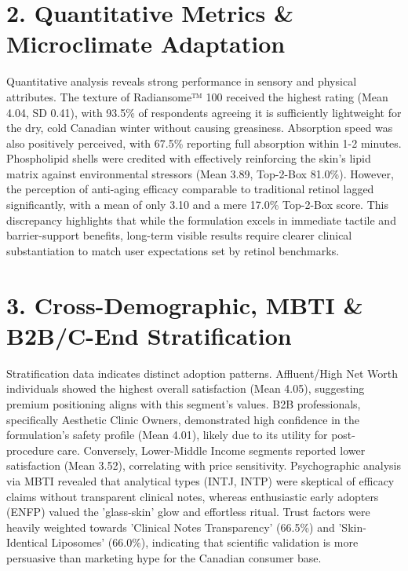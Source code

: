 \documentclass[10pt,twocolumn,a4paper]{article}
\begin{document}
\section{2. Quantitative Metrics \& Microclimate Adaptation}
Quantitative analysis reveals strong performance in sensory and physical attributes. The texture of Radiansome™ 100 received the highest rating (Mean 4.04, SD 0.41), with 93.5\% of respondents agreeing it is sufficiently lightweight for the dry, cold Canadian winter without causing greasiness. Absorption speed was also positively perceived, with 67.5\% reporting full absorption within 1-2 minutes. Phospholipid shells were credited with effectively reinforcing the skin's lipid matrix against environmental stressors (Mean 3.89, Top-2-Box 81.0\%). However, the perception of anti-aging efficacy comparable to traditional retinol lagged significantly, with a mean of only 3.10 and a mere 17.0\% Top-2-Box score. This discrepancy highlights that while the formulation excels in immediate tactile and barrier-support benefits, long-term visible results require clearer clinical substantiation to match user expectations set by retinol benchmarks.
\section{3. Cross-Demographic, MBTI \& B2B/C-End Stratification}
Stratification data indicates distinct adoption patterns. Affluent/High Net Worth individuals showed the highest overall satisfaction (Mean 4.05), suggesting premium positioning aligns with this segment's values. B2B professionals, specifically Aesthetic Clinic Owners, demonstrated high confidence in the formulation's safety profile (Mean 4.01), likely due to its utility for post-procedure care. Conversely, Lower-Middle Income segments reported lower satisfaction (Mean 3.52), correlating with price sensitivity. Psychographic analysis via MBTI revealed that analytical types (INTJ, INTP) were skeptical of efficacy claims without transparent clinical notes, whereas enthusiastic early adopters (ENFP) valued the 'glass-skin' glow and effortless ritual. Trust factors were heavily weighted towards 'Clinical Notes Transparency' (66.5\%) and 'Skin-Identical Liposomes' (66.0\%), indicating that scientific validation is more persuasive than marketing hype for the Canadian consumer base.
\end{document}
